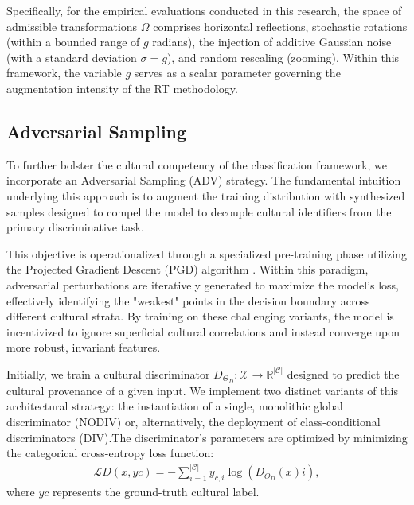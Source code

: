 Specifically, for the empirical evaluations conducted in this research, the space of admissible transformations $\Omega$ comprises horizontal reflections, stochastic rotations (within a bounded range of $g$ radians), the injection of additive Gaussian noise (with a standard deviation $\sigma = g$), and random rescaling (zooming). 
Within this framework, the variable $g$ serves as a scalar parameter governing the augmentation intensity of the RT methodology.

\subsection{Adversarial Sampling}
\label{ch2:sec:adv_sampling}

To further bolster the cultural competency of the classification framework, we incorporate an Adversarial Sampling (ADV) strategy. 
The fundamental intuition underlying this approach is to augment the training distribution with synthesized samples designed to compel the model to decouple cultural identifiers from the primary discriminative task.

This objective is operationalized through a specialized pre-training phase utilizing the Projected Gradient Descent (PGD) algorithm \citep{madry2017towards}. 
Within this paradigm, adversarial perturbations are iteratively generated to maximize the model's loss, effectively identifying the "weakest" points in the decision boundary across different cultural strata. By training on these challenging variants, the model is incentivized to ignore superficial cultural correlations and instead converge upon more robust, invariant features.

Initially, we train a cultural discriminator $D_{\Theta_D}: \mathcal{X} \rightarrow \mathbb{R}^{|\mathcal{C}|}$ designed to predict the cultural provenance of a given input. 
We implement two distinct variants of this architectural strategy: the instantiation of a single, monolithic global discriminator (NODIV) or, alternatively, the deployment of class-conditional discriminators (DIV).The discriminator's parameters are optimized by minimizing the categorical cross-entropy loss function:\begin{align}\mathcal{L}D(x, y{c}) = - \sum_{i=1}^{|\mathcal{C}|} y_{c,i} \log(D_{\Theta_D}(x)i),
\end{align}
where $y{c}$ represents the ground-truth cultural label.

